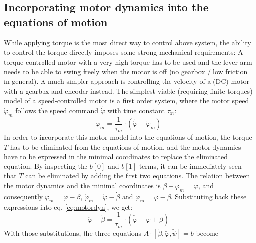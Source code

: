 \documentclass{article}
\begin{document}
\subsection{Incorporating motor dynamics into the equations of motion}
\label{ss:EoM}
While applying torque is the most direct way to control above system, the ability to control the torque directly imposes some strong mechanical requirements: 
A torque-controlled motor with a very high torque has to be used and the lever arm needs to be able to swing freely when the motor is off (no gearbox / low friction in general).
A much simpler approach is controlling the velocity of a (DC)-motor with a gearbox and encoder instead. The simplest viable (requiring finite torques) model of a speed-controlled motor is a first order system, where the motor speed $\dot{\varphi}_m$ follows the speed command $\breve{\dot{\varphi}}$ with time constant $\tau_m$:
\begin{equation}
\ddot{\varphi}_m = \frac{1}{\tau_m} \cdot \left(\breve{\dot{\varphi}} - \dot{\varphi}_m \right)
\label{eq:motordyn}
\end{equation} 
In order to incorporate this motor model into the equations of motion, the torque $T$ has to be eliminated from the equations of motion, and the motor dynamics have to be expressed in the minimal coordinates to replace the eliminated equation.
By inspecting the $b[0]$ and $b[1]$ terms, it can be immediately seen that $T$ can be eliminated by adding the first two equations. 
The relation between the motor dynamics and the minimal coordinates is $\beta + \varphi_m = \varphi$, and consequently $\varphi_m = \varphi - \beta$, $\dot{\varphi}_m = \dot{\varphi} - \dot{\beta}$ and $\ddot{\varphi}_m = \ddot{\varphi} - \ddot{\beta}$.
Substituting back these expressions into eq. \ref{eq:motordyn}, we get:
\begin{equation}
\ddot{\varphi} - \ddot{\beta} = \frac{1}{\tau_m} \cdot \left(\breve{\dot{\varphi}} - \dot{\varphi} + \dot{\beta} \right)
\end{equation}
With those substitutions, the three equations $A \cdot [\ddot{\beta}, \ddot{\varphi}, \ddot{\psi}] = b$ become
\end{document}
